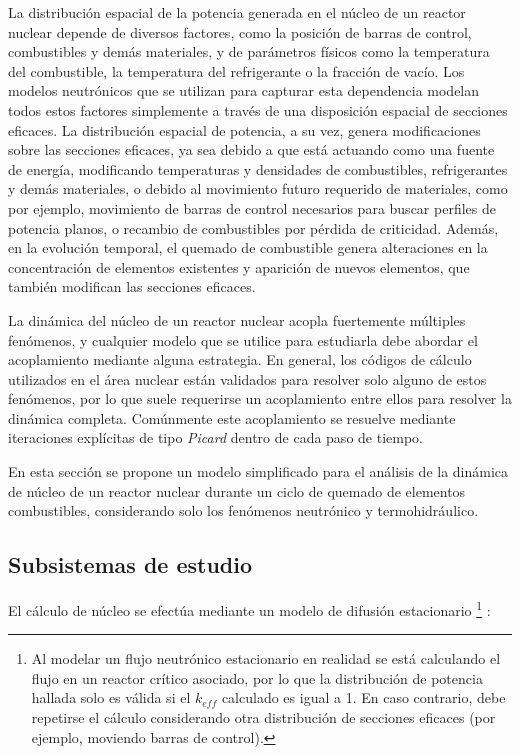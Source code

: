 La distribución espacial de la potencia generada en el núcleo de un reactor nuclear
depende de diversos factores, como la posición de barras de control, combustibles y demás materiales,
y de parámetros físicos como la temperatura del combustible, la temperatura del refrigerante o la fracción de vacío.
Los modelos neutrónicos que se utilizan para capturar esta dependencia modelan todos estos factores simplemente a través de una disposición espacial de secciones eficaces.
La distribución espacial de potencia, a su vez, genera modificaciones sobre las secciones eficaces,
ya sea debido a que está actuando como una fuente de energía, modificando temperaturas y densidades de combustibles, refrigerantes y demás materiales,
o debido al movimiento futuro requerido de materiales,
como por ejemplo, movimiento de barras de control necesarios para buscar perfiles de potencia planos, o recambio de combustibles por pérdida de criticidad.
Además, en la evolución temporal, el quemado de combustible genera alteraciones en la concentración de elementos existentes y aparición de nuevos elementos,
que también modifican las secciones eficaces.

La dinámica del núcleo de un reactor nuclear acopla fuertemente múltiples fenómenos, y cualquier modelo que se utilice para estudiarla debe abordar el acoplamiento mediante alguna estrategia.
En general, los códigos de cálculo utilizados en el área nuclear están validados para resolver solo alguno de estos fenómenos,
por lo que suele requerirse un acoplamiento entre ellos para resolver la dinámica completa.
Comúnmente este acoplamiento se resuelve mediante iteraciones explícitas de tipo \textit{Picard} dentro de cada paso de tiempo.

En esta sección se propone un modelo simplificado para el análisis de la dinámica de núcleo de un reactor nuclear durante un ciclo de quemado de elementos combustibles,
considerando solo los fenómenos neutrónico y termohidráulico.

\subsection*{Subsistemas de estudio}
\label{3:subsistemas-nt}

El cálculo de núcleo se efectúa mediante un modelo de difusión estacionario
\footnote{Al modelar un flujo neutrónico estacionario en realidad se está calculando el flujo en un reactor crítico asociado,
por lo que la distribución de potencia hallada solo es válida si el $k_{eff}$ calculado es igual a 1.
En caso contrario, debe repetirse el cálculo considerando otra distribución de secciones eficaces
(por ejemplo, moviendo barras de control).
} \cite{henry}:

